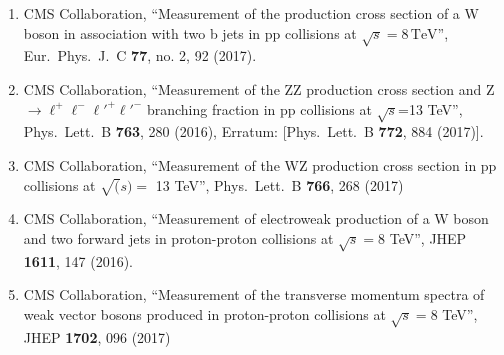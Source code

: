 \begin{itemize}
\begin{enumerate}
\item CMS Collaboration, ``Measurement of the production cross section of a W boson in association with two b jets in pp collisions at $\sqrt{s} = 8{\,\mathrm{{TeV}}} $'', Eur.\ Phys.\ J.\ C {\bf 77}, no. 2, 92 (2017).

\item CMS Collaboration, ``Measurement of the ZZ production cross section and Z $\to \ell^+\ell^-\ell'^+\ell'^-$ branching fraction in pp collisions at $\sqrt s$=13 TeV'', Phys.\ Lett.\ B {\bf 763}, 280 (2016), Erratum: [Phys.\ Lett.\ B {\bf 772}, 884 (2017)].

\item CMS Collaboration, ``Measurement of the WZ production cross section in pp collisions at $\sqrt(s) =$ 13 TeV'', Phys.\ Lett.\ B {\bf 766}, 268 (2017)

\item CMS Collaboration, ``Measurement of electroweak production of a W boson and two forward jets in proton-proton collisions at $ \sqrt{s}=8 $ TeV'', JHEP {\bf 1611}, 147 (2016).

\item CMS Collaboration, ``Measurement of the transverse momentum spectra of weak vector bosons produced in proton-proton collisions at $ \sqrt{s}=8 $ TeV'', JHEP {\bf 1702}, 096 (2017)


\end{enumerate}
\end{itemize}
